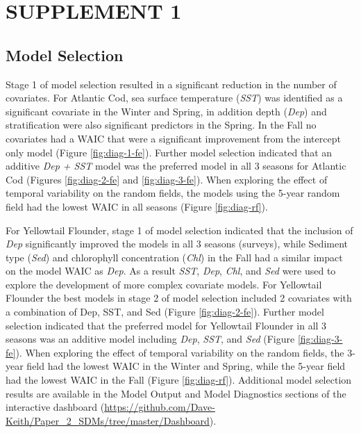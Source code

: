 \documentclass[
]{article}
\begin{document}
\newpage

\hypertarget{ref-sup}{%
\section{SUPPLEMENT 1}\label{ref-sup}}

\setcounter{table}{0}  \renewcommand{\thetable}{S\arabic{table}} \setcounter{figure}{0} \renewcommand{\thefigure}{S\arabic{figure}}

\hypertarget{model-selection}{%
\subsection{Model Selection}\label{model-selection}}

Stage 1 of model selection resulted in a significant reduction in the number of covariates. For Atlantic Cod, sea surface temperature (\emph{SST}) was identified as a significant covariate in the Winter and Spring, in addition depth (\emph{Dep}) and stratification were also significant predictors in the Spring. In the Fall no covariates had a WAIC that were a significant improvement from the intercept only model (Figure \ref{fig:diag-1-fe}). Further model selection indicated that an additive \emph{Dep + SST} model was the preferred model in all 3 seasons for Atlantic Cod (Figures \ref{fig:diag-2-fe} and \ref{fig:diag-3-fe}). When exploring the effect of temporal variability on the random fields, the models using the 5-year random field had the lowest WAIC in all seasons (Figure \ref{fig:diag-rf}).

For Yellowtail Flounder, stage 1 of model selection indicated that the inclusion of \emph{Dep} significantly improved the models in all 3 seasons (surveys), while Sediment type (\emph{Sed}) and chlorophyll concentration (\emph{Chl}) in the Fall had a similar impact on the model WAIC as \emph{Dep}. As a result \emph{SST}, \emph{Dep}, \emph{Chl}, and \emph{Sed} were used to explore the development of more complex covariate models. For Yellowtail Flounder the best models in stage 2 of model selection included 2 covariates with a combination of Dep, SST, and Sed (Figure \ref{fig:diag-2-fe}). Further model selection indicated that the preferred model for Yellowtail Flounder in all 3 seasons was an additive model including \emph{Dep}, \emph{SST}, and \emph{Sed} (Figure \ref{fig:diag-3-fe}). When exploring the effect of temporal variability on the random fields, the 3-year field had the lowest WAIC in the Winter and Spring, while the 5-year field had the lowest WAIC in the Fall (Figure \ref{fig:diag-rf}). Additional model selection results are available in the Model Output and Model Diagnostics sections of the interactive dashboard (\url{https://github.com/Dave-Keith/Paper_2_SDMs/tree/master/Dashboard}).
\end{document}
